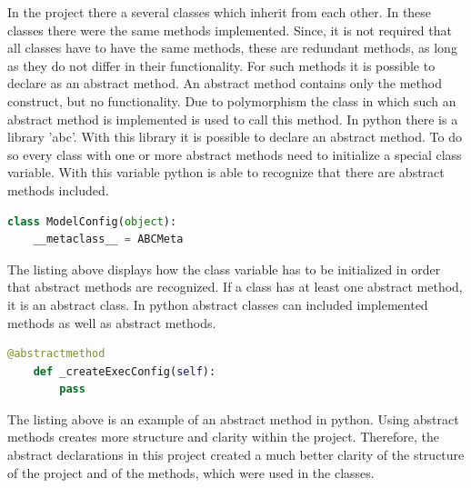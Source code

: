 In the project there a several classes which inherit from each other. In these classes there were the same methods implemented. Since, it is not required that all classes have to have the same methods, these are redundant methods, as long as they do not differ in their functionality. For such methods it is possible to declare as an abstract method. An abstract method contains only the method construct, but no functionality. Due to polymorphism the class in which such an abstract method is implemented is used to call this method. \newline
In python there is a library 'abc'. With this library it is possible to declare an abstract method. To do so every class with one or more abstract methods need to initialize a special class variable. With this variable python is able to recognize that there are abstract methods included.

\begin{lstlisting}[language=Python, caption = The initialization of a class variable which is required by python in order to detect abstract methods and abstract classes.]
class ModelConfig(object):
    __metaclass__ = ABCMeta
\end{lstlisting}

The listing above displays how the class variable has to be initialized in order that abstract methods are recognized. If a class has at least one abstract method, it is an abstract class. In python abstract classes can included implemented methods as well as abstract methods.

\begin{lstlisting}[language=Python, caption = Declaration of an abstract method.]
    @abstractmethod
    def _createExecConfig(self):
        pass
\end{lstlisting}

The listing above is an example of an abstract method in python. Using abstract methods creates more structure and clarity within the project. Therefore, the abstract declarations in this project created a much better clarity of the structure of the project and of the methods, which were used in the classes.


